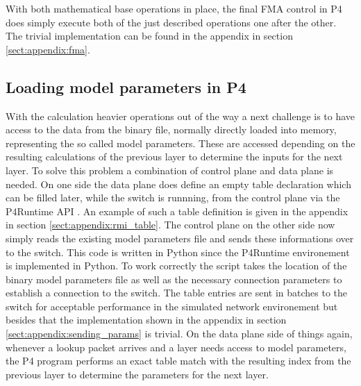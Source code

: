 With both mathematical base operations in place, the final FMA control in P4 does simply execute both of the just described operations one after the other. The trivial implementation can be found in the appendix in section \ref{sect:appendix:fma}.

\subsection{Loading model parameters in P4}
With the calculation heavier operations out of the way a next challenge is to have access to the data from the binary file, normally directly loaded into memory, representing the so called model parameters. These are accessed depending on the resulting calculations of the previous layer to determine the inputs for the next layer. To solve this problem a combination of control plane and data plane is needed. On one side the data plane does define an empty table declaration which can be filled later, while the switch is runnning, from the control plane via the P4Runtime API \cite{p4runtime-spec}. An example of such a table definition is given in the appendix in section \ref{sect:appendix:rmi_table}. The control plane on the other side now simply reads the existing model parameters file and sends these informations over to the switch. This code is written in Python since the P4Runtime environement is implemented in Python. To work correctly the script takes the location of the binary model parameters file as well as the necessary connection parameters to establish a connection to the switch. The table entries are sent in batches to the switch for acceptable performance in the simulated network environement but besides that the implementation shown in the appendix in section \ref{sect:appendix:sending_params} is trivial. On the data plane side of things again, whenever a lookup packet arrives and a layer needs access to model parameters, the P4 program performs an exact table match with the resulting index from the previous layer to determine the parameters for the next layer.

